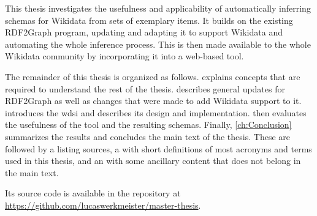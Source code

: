 This thesis investigates the usefulness and applicability
of automatically inferring \glspl{schema} for \gls{Wikidata} from sets of exemplary \glspl{item}.
It builds on the existing \gls{RDF2Graph} \cite{vanDam2015} program,
updating and adapting it to support \gls{Wikidata}
and automating the whole inference process.
This is then made available to the whole \gls{Wikidata} community
by incorporating it into a web-based tool.

The remainder of this thesis
is organized as follows.
 explains concepts that are required
to understand the rest of the thesis.
 describes general updates for \gls{RDF2Graph}
as well as changes that were made to add \gls{Wikidata} support to it.
 introduces the \gls{wdsi}
and describes its design and implementation.
 then evaluates the usefulness of the tool and the resulting \glspl{schema}.
Finally, \cref{ch:Conclusion} summarizes the results and concludes the main text of the thesis.
These are followed by a  listing sources,
a  with short definitions of most acronyms and terms used in this thesis,
and an  with some ancillary content that does not belong in the main text.

\doclicenseLongText
Its source code is available in the repository at
\url{https://github.com/lucaswerkmeister/master-thesis}.
